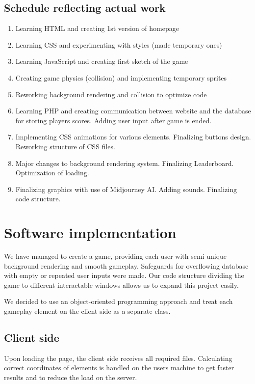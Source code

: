 \documentclass[oneside,a4paper,11pt]{report}
\begin{document}
\section{Schedule reflecting actual work}
\begin{enumerate}
  \item Learning HTML and creating 1st version of homepage 
  \item Learning CSS and experimenting with styles (made temporary ones) 
  \item Learning JavaScript and creating first sketch of the game 
  \item Creating game physics (collision) and implementing temporary sprites
  \item Reworking background rendering and collision to optimize code
  \item Learning PHP and creating communication between website and the database for storing players scores. Adding user input after game is ended.
  \item Implementing CSS animations for various elements. Finalizing buttons design. Reworking structure of CSS files. 
  \item Major changes to background rendering system. Finalizing Leaderboard. Optimization of loading.
  \item Finalizing graphics with use of Midjourney AI. Adding sounds. Finalizing code structure.
\end{enumerate}


\chapter{Software implementation}

We have managed to create a game, providing each user with semi unique background rendering and smooth gameplay. 
Safeguards for overflowing database with empty or repeated user inputs were made.
Our code structure dividing the game to different interactable windows allows us to expand this project easily.

\par
We decided to use an object-oriented programming approach and treat each gameplay element on the client side as a separate class.


\section{Client side}

Upon loading the page, the client side receives all required files. Calculating correct coordinates of elements is handled on the users machine to get faster results and to reduce the load on the server.
\end{document}
